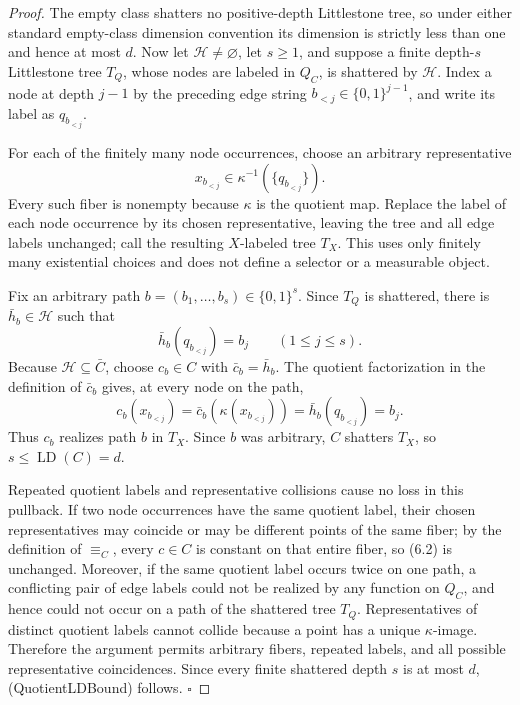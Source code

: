 \begin{proof}
The empty class shatters no positive-depth Littlestone tree, so
under either standard empty-class dimension convention its dimension is
strictly less than one and hence at most \(d\). Now let
\(\mathcal H\ne\varnothing\), let \(s\ge1\), and suppose a
finite depth-\(s\) Littlestone tree \(T_Q\), whose nodes are labeled in
\(Q_C\), is shattered by \(\mathcal H\). Index a node at depth \(j-1\) by
the preceding edge string \(b_{<j}\in\{0,1\}^{j-1}\), and write its label
as \(q_{b_{<j}}\).

For each of the finitely many node occurrences, choose an arbitrary
representative
\[
x_{b_{<j}}\in\kappa^{-1}(\{q_{b_{<j}}\}).
\]
Every such fiber is nonempty because \(\kappa\) is the quotient map. Replace
the label of each node occurrence by its chosen representative, leaving the
tree and all edge labels unchanged; call the resulting \(X\)-labeled tree
\(T_X\). This uses only finitely many existential choices and does not
define a selector or a measurable object.

Fix an arbitrary path \(b=(b_1,\ldots,b_s)\in\{0,1\}^s\). Since \(T_Q\)
is shattered, there is \(\bar h_b\in\mathcal H\) such that
\[
\bar h_b(q_{b_{<j}})=b_j\qquad(1\le j\le s).
\tag{6.1}
\]
Because \(\mathcal H\subseteq\bar C\), choose \(c_b\in C\) with
\(\bar c_b=\bar h_b\). The quotient factorization in the definition of
\(\bar c_b\) gives, at every node on the path,
\[
c_b(x_{b_{<j}})
=\bar c_b(\kappa(x_{b_{<j}}))
=\bar h_b(q_{b_{<j}})
=b_j.
\tag{6.2}
\]
Thus \(c_b\) realizes path \(b\) in \(T_X\). Since \(b\) was arbitrary,
\(C\) shatters \(T_X\), so \(s\le\operatorname{LD}(C)=d\).

Repeated quotient labels and representative collisions cause no loss in
this pullback. If two node occurrences have the same quotient label, their
chosen representatives may coincide or may be different points of the same
fiber; by the definition of \(\equiv_C\), every \(c\in C\) is constant on
that entire fiber, so (6.2) is unchanged. Moreover, if the same quotient
label occurs twice on one path, a conflicting pair of edge labels could not
be realized by any function on \(Q_C\), and hence could not occur on a path
of the shattered tree \(T_Q\). Representatives of distinct quotient labels
cannot collide because a point has a unique \(\kappa\)-image. Therefore the
argument permits arbitrary fibers, repeated labels, and all possible
representative coincidences. Since every finite shattered depth \(s\) is at
most \(d\), (QuotientLDBound) follows. \(\square\)


\end{proof}

